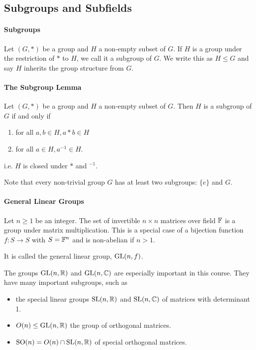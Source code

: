 \subsection{Subgroups and Subfields}
\paragraph{Subgroups}
Let \((G,*)\) be a group and \(H\) a non-empty subset of \(G\). If \(H\) is a group under the restriction of \(*\) to \(H\), we call it a subgroup of \(G\). We write this as \(H \leq G\) and say \(H\) inherits the group structure from \(G\).

\paragraph{The Subgroup Lemma}
Let \((G,*)\) be a group and \(H\) a non-empty subset of \(G\). Then \(H\) is a subgroup of \(G\) if and only if 
\begin{enumerate}
    \item for all \(a,b \in H, a * b \in H\)
    \item for all \(a \in H, a^{-1} \in H\).
\end{enumerate}
i.e. \(H\) is closed under \(*\) and \(^{-1}\).

Note that every non-trivial group \(G\) has at least two subgroups: \(\{e\}\) and \(G\).

\paragraph{General Linear Groups}
Let \(n \geq 1\) be an integer. The set of invertible \(n \times n\) matrices over field \(\mathbb{F}\) is a group under matrix multiplication. This is a special case of a bijection function \(f: S \to S\) with \(S = \mathbb{F}^n\) and is non-abelian if \(n > 1\).

It is called the general linear group, \(\operatorname{GL}(n,f)\).

The groups \(\operatorname{GL}(n,\mathbb{R})\) and \(\operatorname{GL}(n,\mathbb{C})\) are especially important in this course.
They have many important subgroups, such as 
\begin{itemize}
    \item the special linear groups \(\operatorname{SL}(n,\mathbb{R})\) and \(\operatorname{SL}(n,\mathbb{C})\) of matrices with determinant 1.
    \item \(O(n) \leq \operatorname{GL}(n,\mathbb{R})\) the group of orthogonal matrices.
    \item \(\operatorname{SO}(n) = O(n) \cap \operatorname{SL}(n,\mathbb{R})\) of special orthogonal matrices.
\end{itemize}

